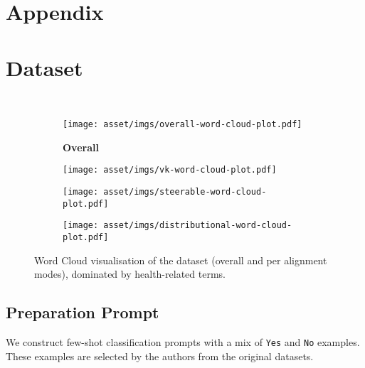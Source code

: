 \section*{Appendix}

\section{\ourdataset Dataset}
\label{app:dataset-details}

\begin{figure}[!htp]
    \
    \begin{subfigure}{0.99\linewidth}
        \texttt{[image: asset/imgs/overall-word-cloud-plot.pdf]}
        \caption{\textbf{Overall}}
    \end{subfigure}
    \begin{subfigure}{0.99\linewidth}
        \texttt{[image: asset/imgs/vk-word-cloud-plot.pdf]}
        \caption{\overton}
    \end{subfigure}
    \begin{subfigure}{0.99\linewidth}
        \texttt{[image: asset/imgs/steerable-word-cloud-plot.pdf]}
        \caption{\steerable}
    \end{subfigure}
    \begin{subfigure}{0.99\linewidth}
        \texttt{[image: asset/imgs/distributional-word-cloud-plot.pdf]}
        \caption{\distributional}
    \end{subfigure}
    \caption{Word Cloud visualisation of the \ourdataset dataset (overall and per alignment modes), dominated by health-related terms.}
    \label{fig:vital-world-clouds}
\end{figure}





\subsection{\ourdataset Preparation Prompt}
\label{app:filter-prompt}
We construct few-shot classification prompts \citep{sorensen2024value} with a mix of \texttt{Yes} and \texttt{No} examples. These examples are selected by the authors from the original datasets.

